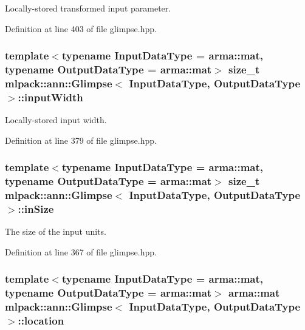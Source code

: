 Locally-\/stored transformed input parameter. 



Definition at line 403 of file glimpse.\+hpp.

\subsubsection[{input\+Width}]{\setlength{\rightskip}{0pt plus 5cm}template$<$typename Input\+Data\+Type  = arma\+::mat, typename Output\+Data\+Type  = arma\+::mat$>$ size\+\_\+t {\bf mlpack\+::ann\+::\+Glimpse}$<$ Input\+Data\+Type, Output\+Data\+Type $>$\+::input\+Width\hspace{0.3cm}{\ttfamily [private]}}\label{classmlpack_1_1ann_1_1Glimpse_ab73311e18413f0522eeb0f0e03ba6b8d}


Locally-\/stored input width. 



Definition at line 379 of file glimpse.\+hpp.

\subsubsection[{in\+Size}]{\setlength{\rightskip}{0pt plus 5cm}template$<$typename Input\+Data\+Type  = arma\+::mat, typename Output\+Data\+Type  = arma\+::mat$>$ size\+\_\+t {\bf mlpack\+::ann\+::\+Glimpse}$<$ Input\+Data\+Type, Output\+Data\+Type $>$\+::in\+Size\hspace{0.3cm}{\ttfamily [private]}}\label{classmlpack_1_1ann_1_1Glimpse_a666ec45c18acab9935c3cbca425a5928}


The size of the input units. 



Definition at line 367 of file glimpse.\+hpp.

\subsubsection[{location}]{\setlength{\rightskip}{0pt plus 5cm}template$<$typename Input\+Data\+Type  = arma\+::mat, typename Output\+Data\+Type  = arma\+::mat$>$ arma\+::mat {\bf mlpack\+::ann\+::\+Glimpse}$<$ Input\+Data\+Type, Output\+Data\+Type $>$\+::location\hspace{0.3cm}{\ttfamily [private]}}\label{classmlpack_1_1ann_1_1Glimpse_a11c718a6318ff7470ac84f25e47c28da}


